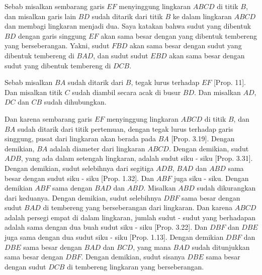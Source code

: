 \documentclass[a4paper]{book}
\begin{document}
\begin{center}
\end{center}

Sebab misalkan sembarang garis $EF$ menyinggung lingkaran $ABCD$ di titik $B$,
dan misalkan garis lain $BD$ sudah ditarik dari titik $B$ ke dalam lingkaran 
$ABCD$ dan membagi lingkaran menjadi dua. Saya katakan bahwa sudut yang 
dibentuk $BD$ dengan garis singgung $EF$ akan sama besar dengan yang dibentuk 
tembereng yang berseberangan. Yakni, sudut $FBD$ akan sama besar dengan sudut
yang dibentuk tembereng di $BAD$, dan sudut sudut $EBD$ akan sama besar dengan 
sudut yang dibentuk tembereng di $DCB$.

Sebab misalkan $BA$ sudah ditarik dari $B$, tegak lurus terhadap $EF$ [Prop.
11]. Dan misalkan titik $C$ sudah diambil secara acak di busur $BD$. Dan
misalkan $AD$, $DC$ dan $CB$ sudah dihubungkan.

Dan karena sembarang garis $EF$ menyinggung lingkaran $ABCD$ di titik $B$, dan
$BA$ sudah ditarik dari titik pertemuan, dengan tegak lurus terhadap garis 
singgung, pusat dari lingkaran akan berada pada $BA$ [Prop. 3.19]. Dengan 
demikian, $BA$ adalah diameter dari lingkaran $ABCD$. Dengan demikian, sudut
$ADB$, yang ada dalam setengah lingkaran, adalah sudut siku - siku [Prop. 3.31].
Dengan demikian, sudut selebihnya dari segitiga $ADB$,  $BAD$ dan $ABD$ sama
besar dengan sudut siku - siku [Prop. 1.32]. Dan $ABF$ juga siku - siku.
Dengan demikian $ABF$ sama dengan $BAD$ dan $ABD$. Misalkan $ABD$ sudah
dikurangkan dari keduanya. Dengan demikian, sudut selebihnya $DBF$ sama besar
dengan sudut $BAD$ di tembereng yang berseberangan dari lingkaran. Dan karena
$ABCD$ adalah persegi empat di dalam lingkaran, jumlah sudut - sudut yang 
berhadapan adalah sama dengan dua buah sudut siku - siku [Prop. 3.22].
Dan $DBF$ dan $DBE$ juga sama dengan dua sudut siku - siku [Prop. 1.13].
Dengan demikian $DBF$ dan $DBE$ sama besar dengan $BAD$ dan $BCD$, yang mana
$BAD$ sudah ditunjukkan sama besar dengan $DBF$. Dengan demikian, sudut sisanya
$DBE$ sama besar dengan sudut $DCB$ di tembereng lingkaran yang berseberangan.
\end{document}
